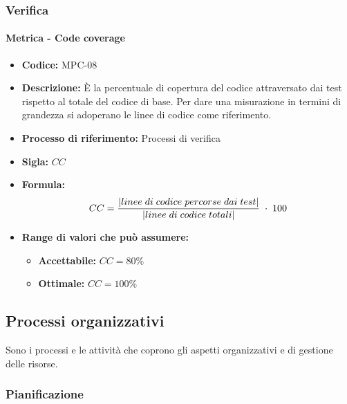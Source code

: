 \subsubsection{Verifica}
    \paragraph{Metrica - Code coverage}
    \begin{itemize}
        \item \textbf{Codice:} MPC-08
        \item \textbf{Descrizione:} È la percentuale di copertura del codice attraversato dai test rispetto al totale del codice di base. Per dare una misurazione in termini di grandezza si adoperano le linee di codice come riferimento.
        \item \textbf{Processo di riferimento:} Processi di verifica
        \item \textbf{Sigla:} $CC$
        \item \textbf{Formula:} $$CC = {|linee \; di \; codice \; percorse \; dai  \; test| \over |linee \; di \; codice \; totali|} \; \cdot \; 100$$
        \item \textbf{Range di valori che può assumere:}
        \begin{itemize}
            \item \textbf{Accettabile:} $CC = 80\%$
            \item \textbf{Ottimale:} $CC = 100\%$
        \end{itemize}
    \end{itemize}

\subsection{Processi organizzativi}
Sono i processi e le attività che coprono gli aspetti organizzativi e di gestione delle risorse.

\subsubsection{Pianificazione}
